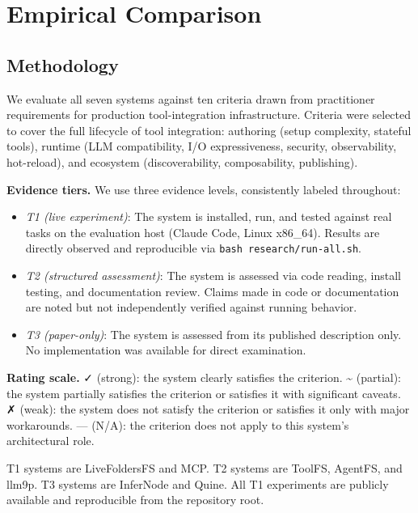 \documentclass[
  11pt,
]{article}
\providecommand{\tightlist}{%
  \setlength{\itemsep}{0pt}\setlength{\parskip}{0pt}}
\begin{document}
\hypertarget{empirical-comparison}{%
\section{Empirical Comparison}\label{empirical-comparison}}

\hypertarget{methodology}{%
\subsection{Methodology}\label{methodology}}

We evaluate all seven systems against ten criteria drawn from
practitioner requirements for production tool-integration
infrastructure. Criteria were selected to cover the full lifecycle of
tool integration: authoring (setup complexity, stateful tools), runtime
(LLM compatibility, I/O expressiveness, security, observability,
hot-reload), and ecosystem (discoverability, composability, publishing).

\textbf{Evidence tiers.} We use three evidence levels, consistently
labeled throughout:

\begin{itemize}
\tightlist
\item
  \emph{T1 (live experiment)}: The system is installed, run, and tested
  against real tasks on the evaluation host (Claude Code, Linux
  x86\_64). Results are directly observed and reproducible via
  \texttt{bash\ research/run-all.sh}.
\item
  \emph{T2 (structured assessment)}: The system is assessed via code
  reading, install testing, and documentation review. Claims made in
  code or documentation are noted but not independently verified against
  running behavior.
\item
  \emph{T3 (paper-only)}: The system is assessed from its published
  description only. No implementation was available for direct
  examination.
\end{itemize}

\textbf{Rating scale.} ✓ (strong): the system clearly satisfies the
criterion. \textasciitilde{} (partial): the system partially satisfies
the criterion or satisfies it with significant caveats. ✗ (weak): the
system does not satisfy the criterion or satisfies it only with major
workarounds. --- (N/A): the criterion does not apply to this system's
architectural role.

T1 systems are LiveFoldersFS and MCP. T2 systems are ToolFS, AgentFS,
and llm9p. T3 systems are InferNode and Quine. All T1 experiments are
publicly available and reproducible from the repository root.
\end{document}
